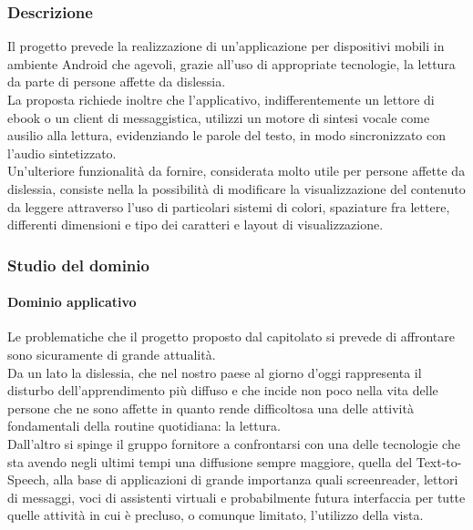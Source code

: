		\subsubsection{Descrizione}
		Il progetto prevede la realizzazione di un'applicazione per dispositivi mobili in ambiente Android che agevoli, grazie all'uso di appropriate tecnologie, 
		la lettura da parte di persone affette da dislessia.
		\\La proposta richiede inoltre che l'applicativo, indifferentemente un lettore di ebook o un client di messaggistica, utilizzi un motore di sintesi 
		vocale come ausilio alla lettura, evidenziando le parole del testo, in modo sincronizzato con l'audio sintetizzato. 
		\\Un'ulteriore funzionalità da fornire, considerata molto utile per persone affette da dislessia, consiste nella la possibilità di 
		modificare la visualizzazione del contenuto da leggere attraverso l'uso di particolari sistemi di colori, spaziature fra lettere, differenti dimensioni 
		e tipo dei caratteri e layout di visualizzazione.
		\subsubsection{Studio del dominio}
			\paragraph{Dominio applicativo}
			Le problematiche che il progetto proposto dal capitolato si prevede di affrontare sono sicuramente di grande attualità.
			\\Da un lato la dislessia, che nel nostro paese al giorno d'oggi rappresenta il disturbo dell'apprendimento più diffuso e che incide non poco nella 
			vita delle persone che ne sono affette in quanto rende difficoltosa una delle attività fondamentali della routine quotidiana: la lettura. 
			\\Dall'altro si spinge il gruppo fornitore a confrontarsi con una delle tecnologie che sta avendo negli ultimi tempi una diffusione sempre 
			maggiore, quella del Text-to-Speech, alla base di applicazioni di grande importanza quali screenreader, lettori di messaggi, voci di 
			assistenti virtuali e probabilmente futura interfaccia per tutte quelle attività in cui è precluso, o comunque limitato, l'utilizzo della vista.
